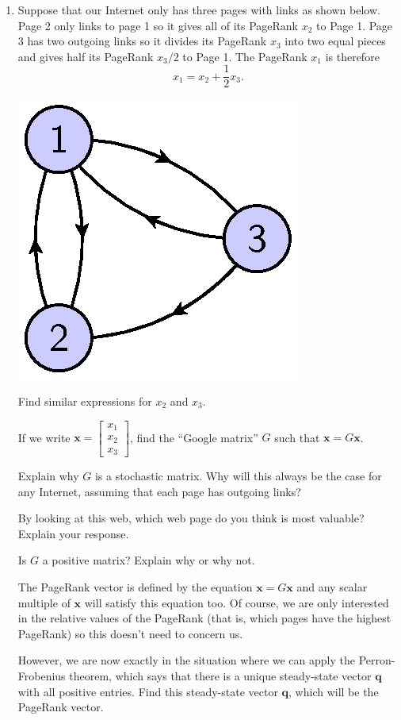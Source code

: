 \documentclass[12pt]{article}
\newcommand{\vs}[1]{\vspace{#1in}}
\newcommand{\qvec}{{\mathbf q}}
\newcommand{\xvec}{{\mathbf x}}
\newcommand{\threevec}[3]{\left[\begin{array}{r}#1 \\ #2 \\ #3
  \end{array}\right]}
\begin{document}
\bigskip
\begin{enumerate}
\item Suppose that our Internet only has three pages with links as
  shown below.  Page 2 only links to page 1 so it gives all of its
  PageRank $x_2$ to Page 1.  Page 3 has two outgoing links so it
  divides its PageRank $x_3$ into two equal pieces and gives half its
  PageRank $x_3/2$
  to Page 1.  The PageRank $x_1$ is therefore
  $$
  x_1 = x_2 + \frac 12 x_3.
  $$
  \begin{center}
    \includegraphics{google-intro.eps}
  \end{center}
  Find similar expressions for $x_2$ and $x_3$.

  \vs{1}
  If we write $\xvec = \threevec{x_1}{x_2}{x_3}$, find the ``Google
  matrix'' $G$ such that $\xvec = G\xvec$.

  \vs{1}
  Explain why $G$ is a stochastic matrix.  Why will this always be the
  case for any Internet, assuming that each page has outgoing links?

  \vs{1}
  By looking at this web, which web page do you think is most
  valuable?  Explain your response.

  \vs{1}
  Is $G$ a positive matrix?  Explain why or why not.

  \vs{1}
  The PageRank vector is defined by the equation $\xvec =
  G\xvec$ and any scalar multiple of $\xvec$ will satisfy this
  equation too.  Of course, we are only interested in the relative
  values of the PageRank (that is, which pages have the highest
  PageRank) so this doesn't need to concern us.

  \newpage
  However, we are now exactly in the situation where we can apply the
  Perron-Frobenius theorem, which says that there is a unique
  steady-state vector $\qvec$ with all positive entries.  Find this
  steady-state vector $\qvec$, which will be the PageRank vector.


\end{enumerate}
\end{document}
